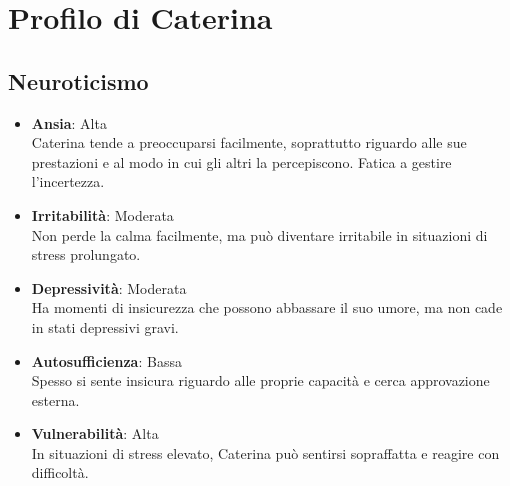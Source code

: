 \section*{Profilo  di Caterina}

\subsection*{Neuroticismo}
\begin{itemize}
    \item \textbf{Ansia}: Alta \\
    Caterina tende a preoccuparsi facilmente, soprattutto riguardo alle sue prestazioni e al modo in cui gli altri la percepiscono. Fatica a gestire l'incertezza.
    
    \item \textbf{Irritabilità}: Moderata \\
    Non perde la calma facilmente, ma può diventare irritabile in situazioni di stress prolungato.
    
    \item \textbf{Depressività}: Moderata \\
    Ha momenti di insicurezza che possono abbassare il suo umore, ma non cade in stati depressivi gravi.
    
    \item \textbf{Autosufficienza}: Bassa \\
    Spesso si sente insicura riguardo alle proprie capacità e cerca approvazione esterna.
    
    \item \textbf{Vulnerabilità}: Alta \\
    In situazioni di stress elevato, Caterina può sentirsi sopraffatta e reagire con difficoltà.
\end{itemize}

